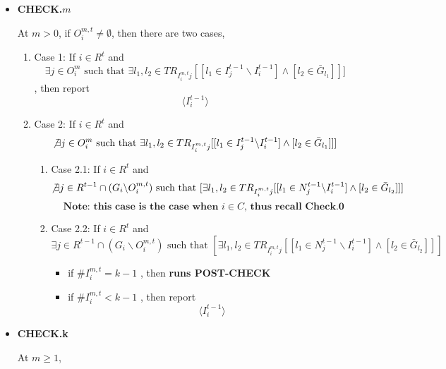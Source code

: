 \documentclass[12pt,letter]{article}
\theoremstyle{definition}
\theoremstyle{remark}
\theoremstyle{claim}
\begin{document}
\begin{itemize}
\begin{enumerate}
\begin{itemize}
\end{itemize}
\end{enumerate}




\item \textbf{CHECK.$m$}

 At $m>0$, if $O^{m,t}_i\neq \emptyset$, then there are two cases, 
\begin{enumerate}
\item Case 1: If $i\in R^t$ and 
\[\exists j\in  O^m_i \text{ such that }\exists l_1,l_2\in TR_{I^{m,t}_ij}[[l_1\in I^{t-1}_j\backslash I^{t-1}_i] \wedge [l_2\in \bar{G}_{l_1}]]]\]
, then report 
\[\langle I^{t-1}_i \rangle\]
\item Case 2: If $i\in R^t$ and 
\[\not\exists j\in  O^m_i \text{ such that }\exists l_1,l_2\in TR_{I^{m,t}_ij}[[l_1\in I^{t-1}_j\backslash I^{t-1}_i] \wedge [l_2\in \bar{G}_{l_1}]]]\]

\begin{enumerate}
\item Case 2.1: If $i\in R^t$ and 
\[\not\exists j\in R^{t-1}\cap (G_i\backslash  O^{m,t}_i) \text{ such that }[\exists l_1,l_2\in TR_{I^{m,t}_ij}[[l_1\in N^{t-1}_j\backslash I^{t-1}_i] \wedge [l_2\in \bar{G}_{l_2}]]]\]
\[\textbf{Note: this case is the case when $i\in C$, thus recall Check.0}\]

\item Case 2.2: If $i\in R^t$ and 
\[\exists j\in R^{t-1}\cap (G_i\backslash  O^{m,t}_i) \text{ such that }[\exists l_1,l_2\in TR_{I^{m,t}_ij}[[l_1\in N^{t-1}_j\backslash I^{t-1}_i] \wedge [l_2\in \bar{G}_{l_2}]]]\]

\begin{itemize}
\item if $\# I^{m,t}_i= k-1$
, then 
\textbf{runs POST-CHECK }

\item if $\# I^{m,t}_i< k-1$
, then report 
\[\langle I^{t-1}_i \rangle\]
\end{itemize}





\end{enumerate}

\end{enumerate}





\item \textbf{CHECK.k}

At $m\geq 1$, 
\begin{enumerate}



\end{enumerate}
\end{itemize}
\end{document}
